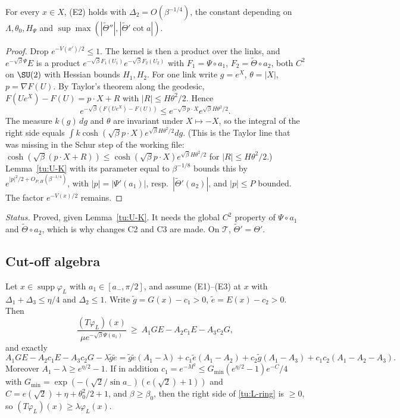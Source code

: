 \begin{lemma}[(E2)]\label{tu:L-E2}
For every $x\in X$, (E2) holds with $\Delta_2=O(\beta^{-1/4})$, the constant depending on
$\Lambda,\theta_0,H_\Psi$ and $\sup\max(|\tilde\Theta''|,|\tilde\Theta'\cot a|)$.
\end{lemma}

\begin{proof}
Drop $e^{-V(x')/2}\le1$. The kernel is then a product over the links, and $e^{-\sqrt\beta\Psi}E$ is a product
$e^{-\sqrt\beta F_1(U_1)}e^{-\sqrt\beta F_2(U_2)}$ with $F_1=\Psi\circ a_1$, $F_2=\tilde\Theta\circ a_2$, both $C^2$ on
$\SU(2)$ with Hessian bounds $H_1,H_2$. For one link write $g=e^X$, $\theta=|X|$, $p=\nabla F(U)$. By Taylor's
theorem along the geodesic, $F(Ue^X)-F(U)=p\cdot X+R$ with $|R|\le H\theta^2/2$. Hence
\[
e^{-\sqrt\beta(F(Ue^X)-F(U))}\le e^{-\sqrt\beta p\cdot X}e^{\sqrt\beta H\theta^2/2}.
\]
The measure $k(g)\,dg$ and $\theta$ are invariant under $X\mapsto-X$, so the integral of the right side equals
$\int k\cosh(\sqrt\beta p\cdot X)e^{\sqrt\beta H\theta^2/2}dg$. (This is the Taylor line that was missing in the
Schur step of the working file: $\cosh(\sqrt\beta(p\cdot X+R))\le\cosh(\sqrt\beta p\cdot X)e^{\sqrt\beta H\theta^2/2}$
for $|R|\le H\theta^2/2$.) Lemma~\ref{tu:U-K} with its parameter equal to $\beta^{-1/8}$ bounds this by
$e^{|p|^2/2+O_{P,H}(\beta^{-1/4})}$, with $|p|=|\Psi'(a_1)|$, resp.\ $|\tilde\Theta'(a_2)|$, and $|p|\le P$ bounded.
The factor $e^{-V(x)/2}$ remains.
\end{proof}

\noindent\emph{Status.} Proved, given Lemma~\ref{tu:U-K}. It needs the global $C^2$ property of $\Psi\circ a_1$
and $\tilde\Theta\circ a_2$, which is why changes C2 and C3 are made. On $\mathcal T$, $\tilde\Theta'=\Theta'$.

\subsection{Cut-off algebra}

\begin{lemma}[S4-alg]\label{tu:L-S4}
Let $x\in\operatorname{supp}\varphi_L$ with $a_1\in[a_-,\pi/2]$, and assume (E1)--(E3) at $x$ with
$\Delta_1+\Delta_3\le\eta/4$ and $\Delta_2\le1$. Write $\tilde g=G(x)-c_1>0$, $\tilde e=E(x)-c_2>0$. Then
\begin{equation}\label{tu:L-cutoff}
\frac{(T\varphi_L)(x)}{\mu e^{-\sqrt\beta\Psi(a_1)}}\ \ge\ A_1GE-A_2c_1E-A_3c_2G,
\end{equation}
and exactly
\begin{equation}\label{tu:L-ring}
A_1GE-A_2c_1E-A_3c_2G-\lambda\tilde g\tilde e=\tilde g\tilde e(A_1-\lambda)+c_1\tilde e(A_1-A_2)+c_2\tilde g(A_1-A_3)+c_1c_2(A_1-A_2-A_3).
\end{equation}
Moreover $A_1-\lambda\ge e^{\eta/2}-1$. If in addition $c_1=e^{-M^2}\le G_{\min}(e^{\eta/2}-1)e^{-C}/4$ with
$G_{\min}=\exp(-(\sqrt2/\sin a_-)(e(\sqrt2)+1))$ and $C=e(\sqrt2)+\eta+\theta_0^2/2+1$, and $\beta\ge\beta_0$, then the
right side of \eqref{tu:L-ring} is $\ge0$, so $(T\varphi_L)(x)\ge\lambda\varphi_L(x)$.
\end{lemma}

